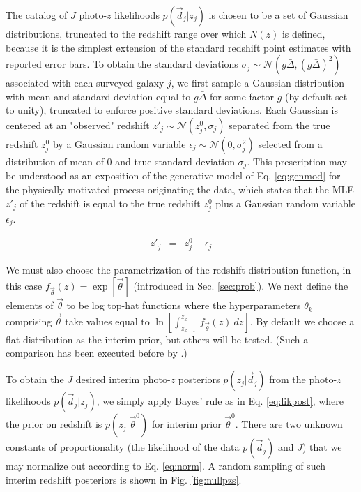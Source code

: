 \documentclass[preprint]{aastex}
\begin{document}
The catalog of $J$ photo-$z$ likelihoods $p(\vec{d}_{j}|z_{j})$ is chosen to be 
a set of Gaussian distributions, truncated to the redshift range over which 
$N(z)$ is defined, because it is the simplest extension of the standard 
redshift point estimates with reported error bars.  To obtain the standard 
deviations $\sigma_{j}\sim\mathcal{N}(g\bar{\Delta},(g\bar{\Delta})^{2})$ 
associated with each surveyed galaxy $j$, we first sample a Gaussian 
distribution with mean and standard deviation equal to $g\bar{\Delta}$ for some 
factor $g$ (by default set to unity), truncated to enforce positive standard 
deviations.  Each Gaussian is centered at an "observed" redshift 
$z'_{j}\sim\mathcal{N}(z^{0}_{j},\sigma_{j})$ separated from the true redshift 
$z^{0}_{j}$ by a Gaussian random variable 
$\epsilon_{j}\sim\mathcal{N}(0,\sigma^{2}_{j})$ selected from a distribution of 
mean of 0 and true standard deviation $\sigma_{j}$.   This prescription may be 
understood as an exposition of the generative model of Eq. \ref{eq:genmod} for 
the physically-motivated process originating the data, which states that the 
MLE $z'_{j}$ of the redshift is equal to the true redshift $z^{0}_{j}$ plus a 
Gaussian random variable $\epsilon_{j}$.

\begin{eqnarray}
\label{eq:genmod}
z'_{j} &=& z^{0}_{j}+\epsilon_{j}
\end{eqnarray}

We must also choose the parametrization of the redshift distribution function, 
in this case $f_{\vec{\theta}}(z)=\exp[\vec{\theta}]$ (introduced in Sec. 
\ref{sec:prob}).  We next define the elements of $\vec{\theta}$ to be log 
top-hat functions where the hyperparameters $\theta_{k}$ comprising 
$\vec{\theta}$ take values equal to $\ln[\int_{z_{k-1}}^{z_{k}}\ 
f_{\vec{\theta}}(z)\ dz]$.  By default we choose a flat distribution as the 
interim prior, but others will be tested.  (Such a comparison has been executed 
before by \citet{Viironen2015}.)

To obtain the $J$ desired interim photo-$z$ posteriors $p(z_{j}|\vec{d}_{j})$ 
from the photo-$z$ likelihoods $p(\vec{d}_{j}|z_{j})$, we simply apply Bayes' 
rule as in Eq. \ref{eq:likpost}, where the prior on redshift is 
$p(z_{j}|\vec{\theta}^{0})$ for interim prior $\vec{\theta}^{0}$.  There are 
two unknown constants of proportionality (the likelihood of the data 
$p(\vec{d}_{j})$ and $J$) that we may normalize out according to Eq. 
\ref{eq:norm}.  A random sampling of such interim redshift posteriors is shown 
in Fig. \ref{fig:nullpzs}.
\end{document}
